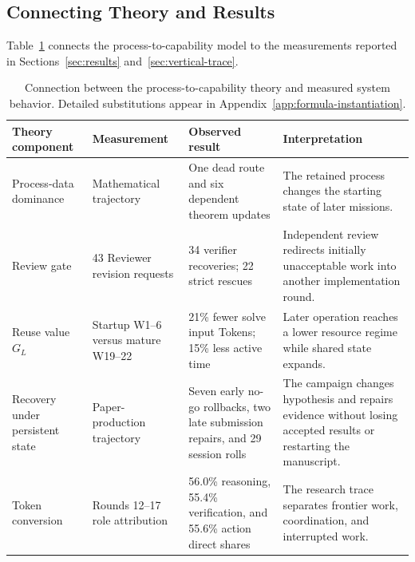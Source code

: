 \subsection{Connecting Theory and Results}

Table~\ref{tab:theory-results} connects the process-to-capability model to the
measurements reported in Sections~\ref{sec:results} and~\ref{sec:vertical-trace}.

\begin{table}[H]
\centering
\scriptsize
\renewcommand{\arraystretch}{1.12}
\begin{tabularx}{\linewidth}{@{}p{2.4cm}p{3.55cm}p{2.55cm}X@{}}
\toprule
\rowcolor{papersand}
\textbf{Theory component} & \textbf{Measurement} & \textbf{Observed result} & \textbf{Interpretation} \\
\midrule
Process-data dominance & Mathematical trajectory & One dead route and six dependent theorem updates & The retained process changes the starting state of later missions. \\
Review gate & 43 Reviewer revision requests & 34 verifier recoveries; 22 strict rescues & Independent review redirects initially unacceptable work into another implementation round. \\
Reuse value $G_L$ & Startup W1--6 versus mature W19--22 & 21\% fewer solve input Tokens; 15\% less active time & Later operation reaches a lower resource regime while shared state expands. \\
Recovery under persistent state & Paper-production trajectory & Seven early no-go rollbacks, two late submission repairs, and 29 session rolls & The campaign changes hypothesis and repairs evidence without losing accepted results or restarting the manuscript. \\
Token conversion & Rounds 12--17 role attribution & 56.0\% reasoning, 55.4\% verification, and 55.6\% action direct shares & The research trace separates frontier work, coordination, and interrupted work. \\
\bottomrule
\end{tabularx}
\caption{Connection between the process-to-capability theory and measured system
behavior. Detailed substitutions appear in Appendix~\ref{app:formula-instantiation}.}
\label{tab:theory-results}
\end{table}
